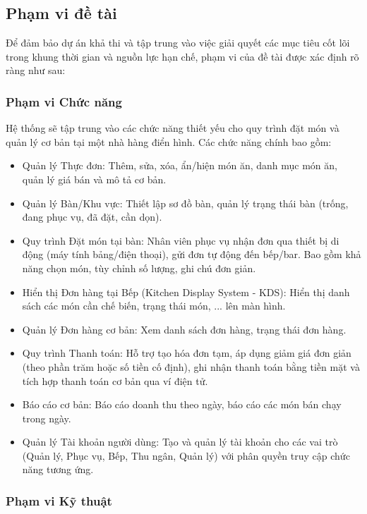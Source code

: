 \subsection{Phạm vi đề tài}

Để đảm bảo dự án khả thi và tập trung vào việc giải quyết các mục tiêu cốt lõi trong khung thời gian và nguồn lực hạn chế, phạm vi của đề tài được xác định rõ ràng như sau:

\subsubsection{Phạm vi Chức năng}

Hệ thống sẽ tập trung vào các chức năng thiết yếu cho quy trình đặt món và quản lý cơ bản tại một nhà hàng điển hình. Các chức năng chính bao gồm:
        \begin{itemize}
            \item Quản lý Thực đơn: Thêm, sửa, xóa, ẩn/hiện món ăn, danh mục món ăn, quản lý giá bán và mô tả cơ bản.
            \item Quản lý Bàn/Khu vực: Thiết lập sơ đồ bàn, quản lý trạng thái bàn (trống, đang phục vụ, đã đặt, cần dọn).
            \item Quy trình Đặt món tại bàn: Nhân viên phục vụ nhận đơn qua thiết bị di động (máy tính bảng/điện thoại), gửi đơn tự động đến bếp/bar. Bao gồm khả năng chọn món, tùy chỉnh số lượng, ghi chú đơn giản.
            \item Hiển thị Đơn hàng tại Bếp (Kitchen Display System - KDS): Hiển thị danh sách các món cần chế biến, trạng thái món, ... lên màn hình.
            \item Quản lý Đơn hàng cơ bản: Xem danh sách đơn hàng, trạng thái đơn hàng.
            \item Quy trình Thanh toán: Hỗ trợ tạo hóa đơn tạm, áp dụng giảm giá đơn giản (theo phần trăm hoặc số tiền cố định), ghi nhận thanh toán bằng tiền mặt và tích hợp thanh toán cơ bản qua ví điện tử.
            \item Báo cáo cơ bản: Báo cáo doanh thu theo ngày, báo cáo các món bán chạy trong ngày.
            \item Quản lý Tài khoản người dùng: Tạo và quản lý tài khoản cho các vai trò (Quản lý, Phục vụ, Bếp, Thu ngân, Quản lý) với phân quyền truy cập chức năng tương ứng.
        \end{itemize}

\subsubsection{Phạm vi Kỹ thuật}

